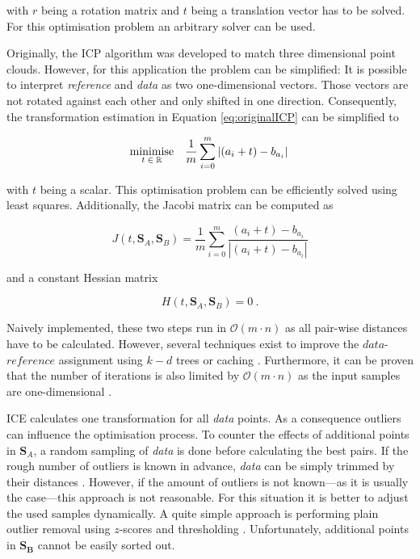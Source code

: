 \documentclass[conference]{IEEEtran}
\theoremstyle{examplestyle}
\begin{document}
with \(r\) being a rotation matrix and \(t\) being a translation vector has to be solved. For this optimisation problem an arbitrary solver can be used.

Originally, the \ac{ICP} algorithm was developed to match three dimensional point clouds. However, for this application the problem can be simplified: It is possible to interpret \textit{reference} and \textit{data} as two one-dimensional vectors. Those vectors are not rotated against each other and only shifted in one direction. Consequently, the transformation estimation in Equation \eqref{eq:originalICP} can be simplified to

\begin{equation}
	\underset{t \; \in \; \mathbb{R}}{\text{minimise}}	\quad	\dfrac{1}{m} \sum_{i = 0}^{m} \left| (a_i + t) - b_{a_i} \right| \\
\end{equation}

with \(t\) being a scalar. This optimisation problem can be efficiently solved using least squares. Additionally, the Jacobi matrix can be computed as

\begin{equation}
	J(t, \pmb{S}_A, \pmb{S}_B) = \dfrac{1}{m} \sum_{i = 0}^{m} \dfrac{ (a_i + t) - b_{a_i} }{ \left| (a_i + t) - b_{a_i} \right| }
\end{equation}

and a constant Hessian matrix

\begin{equation}
	H(t, \pmb{S}_A, \pmb{S}_B) = 0~.
\end{equation}

Naively implemented, these two steps run in \(\mathcal{O}(m \cdot n)\) as all pair-wise distances have to be calculated. However, several techniques exist to improve the \(data\)-\(reference\) assignment using \(k-d\) trees or caching \cite{Pomerleau2015}. Furthermore, it can be proven that the number of iterations is also limited by \(\mathcal{O}(m \cdot n)\) as the input samples are one-dimensional \cite{Ezra2008}.

\ac{ICE} calculates one transformation for all \textit{data} points. As a consequence outliers can influence the optimisation process. To counter the effects of additional points in \(\pmb{S}_A\), a random sampling of \textit{data} is done before calculating the best pairs. If the rough number of outliers is known in advance, \textit{data} can be simply trimmed by their distances \cite{Chetverikov2002}. However, if the amount of outliers is not known---as it is usually the case---this approach is not reasonable. For this situation it is better to adjust the used samples dynamically. A quite simple approach is performing plain outlier removal using \(z\)-scores and thresholding \cite{Phillips2007}. Unfortunately, additional points in \(\pmb{S_B}\) cannot be easily sorted out.
\end{document}
